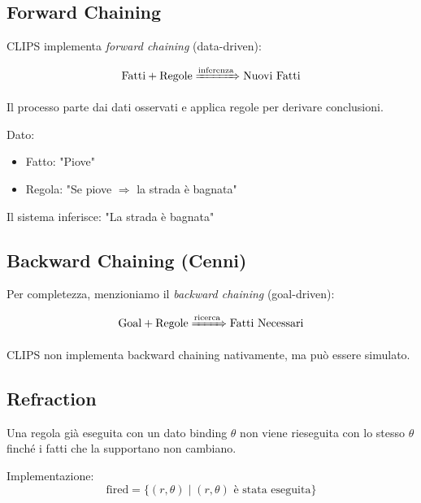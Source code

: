 \subsection{Forward Chaining}

CLIPS implementa \textit{forward chaining} (data-driven):

\begin{equation}
\text{Fatti} + \text{Regole} \xRightarrow{\text{inferenza}} \text{Nuovi Fatti}
\end{equation}

Il processo parte dai dati osservati e applica regole per derivare conclusioni.

\begin{esempio}
Dato:
\begin{itemize}
\item Fatto: "Piove"
\item Regola: "Se piove $\Rightarrow$ la strada è bagnata"
\end{itemize}

Il sistema inferisce: "La strada è bagnata"
\end{esempio}

\subsection{Backward Chaining (Cenni)}

Per completezza, menzioniamo il \textit{backward chaining} (goal-driven):

\begin{equation}
\text{Goal} + \text{Regole} \xRightarrow{\text{ricerca}} \text{Fatti Necessari}
\end{equation}

CLIPS non implementa backward chaining nativamente, ma può essere simulato.

\subsection{Refraction}

\begin{definizione}[Refraction]
Una regola già eseguita con un dato binding $\theta$ non viene rieseguita con lo stesso $\theta$ finché i fatti che la supportano non cambiano.
\end{definizione}

Implementazione:
\begin{equation}
\text{fired} = \{(r, \theta) \mid (r, \theta) \text{ è stata eseguita}\}
\end{equation}

